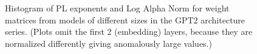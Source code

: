 \begin{figure}[htb]
    \centering

    \quad
    \caption{Histogram of PL exponents 
             and Log Alpha Norm 
             for weight matrices from models of different sizes in the GPT2 architecture series.  (Plots omit the first 2 (embedding) layers, because they are normalized differently giving anomalously large values.)
             }
    \label{fig:gpt2-histograms}
\end{figure}
